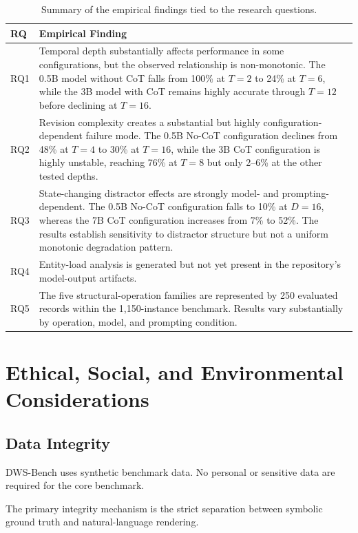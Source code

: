 \documentclass{iutbscthesis}
\begin{document}
\begin{table}[H]
\centering
\begin{tabular}{p{}p{}}
\toprule
\textbf{RQ} & \textbf{Empirical Finding} \\
\midrule
RQ1 & Temporal depth substantially affects performance in some configurations, but the observed relationship is non-monotonic. The 0.5B model without CoT falls from 100\% at $T=2$ to 24\% at $T=6$, while the 3B model with CoT remains highly accurate through $T=12$ before declining at $T=16$. \\
RQ2 & Revision complexity creates a substantial but highly configuration-dependent failure mode. The 0.5B No-CoT configuration declines from 48\% at $T=4$ to 30\% at $T=16$, while the 3B CoT configuration is highly unstable, reaching 76\% at $T=8$ but only 2--6\% at the other tested depths. \\
RQ3 & State-changing distractor effects are strongly model- and prompting-dependent. The 0.5B No-CoT configuration falls to 10\% at $D=16$, whereas the 7B CoT configuration increases from 7\% to 52\%. The results establish sensitivity to distractor structure but not a uniform monotonic degradation pattern. \\
RQ4 & Entity-load analysis is generated but not yet present in the repository's model-output artifacts. \\
RQ5 & The five structural-operation families are represented by 250 evaluated records within the 1,150-instance benchmark. Results vary substantially by operation, model, and prompting condition. \\
\bottomrule
\end{tabular}
\caption{Summary of the empirical findings tied to the research questions.}
\label{tab:rq-summary}
\end{table}

\chapter{Ethical, Social, and Environmental Considerations}
\section{Data Integrity}
DWS-Bench uses synthetic benchmark data. No personal or sensitive data are required for the core
benchmark.

The primary integrity mechanism is the strict separation between symbolic ground truth and natural-language rendering.
\end{document}
